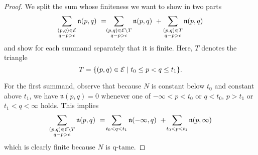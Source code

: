 \begin{proof}
    We split the sum whose finiteness we want to show in two parts
    \begin{equation*}
    \sum_{ \substack{ (p,q) \in \mathcal{E} \\ q-p > \epsilon } } \mathfrak{n} (p,q)
    \ = \!\!
    \sum_{ \substack{ (p,q) \in \mathcal{E} \setminus T \\ q-p > \epsilon } } \mathfrak{n} (p,q)
    \ +
    \sum_{ \substack{ (p,q) \in T \\ q-p > \epsilon } } \mathfrak{n} (p,q)
    \end{equation*}
    and show for each summand separately that it is finite.
    Here, $T$ denotes the triangle
    \begin{equation*}
    T = \{(p,q) \in \mathcal{E} \mid t_0 \leq p < q \leq t_1\}.
    \end{equation*}
    
    For the first summand, observe that because $N$ is constant below $t_0$ and constant above $t_1$, we have $\mathfrak{n}(p,q) = 0$ whenever one of $-\infty < p < t_0$ or $q < t_0$, $p > t_1$ or $t_1 < q < \infty$ holds.
    This implies 
    \begin{equation*}
    \sum_{ \substack{ (p,q) \in \mathcal{E} \setminus T \\ q-p > e } } \mathfrak{n} (p,q)
    \ = \!
    \sum_{t_0 < q < t_1} \mathfrak{n} (-\infty,q)
    \ + \!
    \sum_{t_0 < p < t_1} \mathfrak{n} (p, \infty)
    \end{equation*}
    which is clearly finite because $N$ is q-tame.
    

\end{proof}
